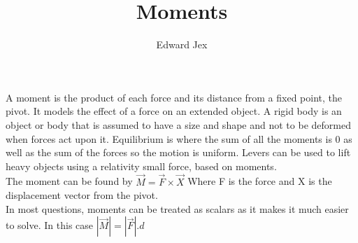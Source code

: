 \documentclass[a4paper,12pt]{article}
\begin{document}
\title{Moments}	
\author{Edward Jex}
\maketitle
A moment is the product of each force and its distance from a fixed point, the pivot. It models the effect of a force on an extended object. A rigid body is an object or body that is assumed to have a size and shape and not to be deformed when forces act upon it. Equilibrium is where the sum of all the moments is 0 as well as the sum of the forces so the motion is uniform. Levers can be used to lift heavy objects using a relativity small force, based on moments. \\

The moment can be found by $\vec{M} = \vec{F} \times \vec{X}$ Where F is the force and X is the displacement vector from the pivot. \\

In most questions, moments can be treated as scalars as it makes it much easier to solve. In this case $|\vec{M}| = |\vec{F}|.d$
\end{document}
